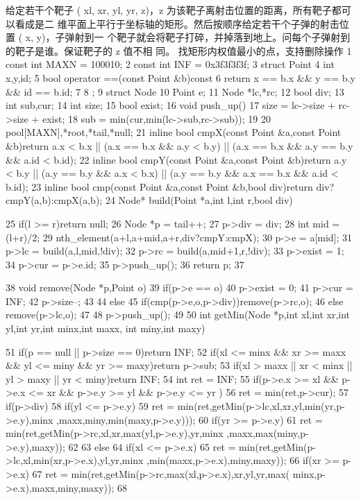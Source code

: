 \documentclass[11pt]{article}
\begin{document}
\begin{Code}
     给定若干个靶子 ( xl, xr, yl, yr, z)，z 为该靶子离射击位置的距离，所有靶子都可以看成是二
     维平面上平行于坐标轴的矩形。然后按顺序给定若干个子弹的射击位置 ( x, y)，子弹射到一
     个靶子就会将靶子打碎，并掉落到地上。问每个子弹射到的靶子是谁。保证靶子的 z 值不相
     同。
     找矩形内权值最小的点，支持删除操作
 1 const int MAXN = 100010;
 2 const int INF = 0x3f3f3f3f;
 3 struct Point{
 4     int x,y,id;
 5     bool operator ==(const Point &b)const{
 6         return x == b.x && y == b.y && id == b.id;
 7     }
 8 };
 9 struct Node{
10     Point e;
11     Node *lc,*rc;
12     bool div;
13     int sub,cur;
14     int size;
15     bool exist;
16     void push_up(){
17         size = lc->size + rc->size + exist;
18         sub = min(cur,min(lc->sub,rc->sub));
19     }
20 }pool[MAXN],*root,*tail,*null;
21 inline bool cmpX(const Point &a,const Point &b){return a.x < b.x ||
       (a.x == b.x && a.y < b.y) || (a.x == b.x && a.y == b.y && a.id
      < b.id);}
22 inline bool cmpY(const Point &a,const Point &b){return a.y < b.y ||
       (a.y == b.y && a.x < b.x) || (a.y == b.y && a.x == b.x && a.id
      < b.id);}
23 inline bool cmp(const Point &a,const Point &b,bool div){return div?
      cmpY(a,b):cmpX(a,b);}
24 Node* build(Point *a,int l,int r,bool div){


25       if(l >= r)return null;
26       Node *p = tail++;
27       p->div = div;
28       int mid = (l+r)/2;
29       nth_element(a+l,a+mid,a+r,div?cmpY:cmpX);
30       p->e = a[mid];
31       p->lc = build(a,l,mid,!div);
32       p->rc = build(a,mid+1,r,!div);
33       p->exist = 1;
34       p->cur = p->e.id;
35       p->push_up();
36       return p;
37   }
38   void remove(Node *p,Point o){
39       if(p->e == o){
40            p->exist = 0;
41            p->cur = INF;
42            p->size--;
43       }
44       else {
45            if(cmp(p->e,o,p->div))remove(p->rc,o);
46            else remove(p->lc,o);
47       }
48       p->push_up();
49   }
50   int getMin(Node *p,int xl,int xr,int yl,int yr,int minx,int maxx,
        int miny,int maxy){
51       if(p == null || p->size == 0)return INF;
52       if(xl <= minx && xr >= maxx && yl <= miny && yr >= maxy)return
            p->sub;
53       if(xl > maxx || xr < minx || yl > maxy || yr < miny)return INF;
54       int ret = INF;
55       if(p->e.x >= xl && p->e.x <= xr && p->e.y >= yl && p->e.y <= yr
            )
56            ret = min(ret,p->cur);
57       if(p->div){
58            if(yl <= p->e.y)
59                ret = min(ret,getMin(p->lc,xl,xr,yl,min(yr,p->e.y),minx
                     ,maxx,miny,min(maxy,p->e.y)));
60            if(yr >= p->e.y)
61                ret = min(ret,getMin(p->rc,xl,xr,max(yl,p->e.y),yr,minx
                     ,maxx,max(miny,p->e.y),maxy));
62       }
63       else {
64            if(xl <= p->e.x)
65                ret = min(ret,getMin(p->lc,xl,min(xr,p->e.x),yl,yr,minx
                     ,min(maxx,p->e.x),miny,maxy));
66            if(xr >= p->e.x)
67                ret = min(ret,getMin(p->rc,max(xl,p->e.x),xr,yl,yr,max(
                     minx,p->e.x),maxx,miny,maxy));
68       }


}
\end{Code}
\end{document}

